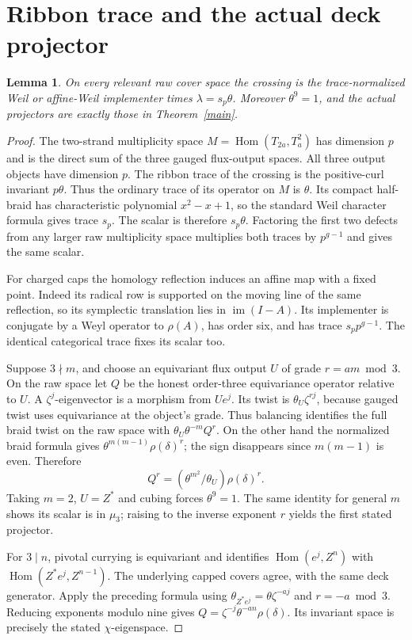 \documentclass[11pt]{amsart}
\newtheorem{lemma}[theorem]{Lemma}
\newcommand{\Hom}{\operatorname{Hom}}
\begin{document}
\section{Ribbon trace and the actual deck projector}
\begin{lemma}\label{normalization}
On every relevant raw cover space the crossing is the trace-normalized
Weil or affine-Weil implementer times $\lambda=s_p\theta$.
Moreover $\theta^9=1$, and the actual projectors are exactly those
in Theorem~\ref{main}.
\end{lemma}
\begin{proof}
The two-strand multiplicity space $M=\Hom(T_{2a},T_a^2)$ has
dimension $p$ and is the direct sum of the three gauged flux-output
spaces. All three output objects have dimension $p$. The ribbon
trace of the crossing is the positive-curl invariant $p\theta$.
Thus the ordinary trace of its operator on $M$ is $\theta$.
Its compact half-braid has characteristic polynomial $x^2-x+1$,
so the standard Weil character formula gives trace $s_p$.
The scalar is therefore $s_p\theta$. Factoring the first two defects
from any larger raw multiplicity space multiplies both traces by
$p^{g-1}$ and gives the same scalar.

For charged caps the homology reflection induces an affine map with
a fixed point. Indeed its radical row is supported on the moving
line of the same reflection, so its symplectic translation lies in
$\operatorname{im}(I-A)$. Its implementer is conjugate by a Weyl
operator to $\rho(A)$, has order six, and has trace $s_pp^{g-1}$.
The identical categorical trace fixes its scalar too.

Suppose $3\nmid m$, and choose an equivariant flux output $U$ of
grade $r=am\bmod3$. On the raw space let $Q$ be the honest order-three
equivariance operator relative to $U$. A $\zeta^j$-eigenvector is a
morphism from $Ue^j$. Its twist is $\theta_U\zeta^{rj}$, because
gauged twist uses equivariance at the object's grade. Thus balancing
identifies the full braid twist on the raw space with
$\theta_U\theta^{-m}Q^r$.
On the other hand the normalized braid formula gives
$\theta^{m(m-1)}\rho(\delta)^r$; the sign disappears since
$m(m-1)$ is even. Therefore
\[
Q^r=(\theta^{m^2}/\theta_U)\rho(\delta)^r.
\]
Taking $m=2$, $U=Z^*$ and cubing forces $\theta^9=1$.
The same identity for general $m$ shows its scalar is in $\mu_3$;
raising to the inverse exponent $r$ yields the first stated projector.

For $3\mid n$, pivotal currying is equivariant and identifies
$\Hom(e^j,Z^n)$ with $\Hom(Z^*e^j,Z^{n-1})$. The underlying capped
covers agree, with the same deck generator. Apply the preceding formula
using $\theta_{Z^*e^j}=\theta\zeta^{-aj}$ and $r=-a\bmod3$.
Reducing exponents modulo nine gives
$Q=\zeta^{-j}\theta^{-an}\rho(\delta)$. Its invariant space is
precisely the stated $\chi$-eigenspace.
\end{proof}
\end{document}
